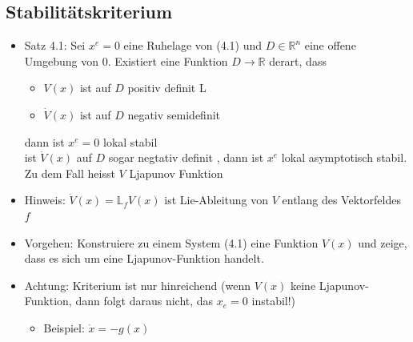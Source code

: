 \documentclass[ngerman]{tudscrreprt}
\begin{document}
\subsection{Stabilitätskriterium}
\begin{itemize}
\item Satz 4.1: Sei $x^e = 0$ eine Ruhelage von (4.1) und $D \in \mathbb{R}^n $ eine offene Umgebung von $0$. Existiert eine Funktion $D\rightarrow \mathbb{R}$ derart, dass

\begin{itemize}
\item $V(x)$ ist auf $D$ positiv definit L
\item $\dot V(x)$ ist auf $D$ negativ semidefinit
\end{itemize} 

dann ist $x^e = 0$ lokal stabil \\
ist $\dot V(x)$ auf $D$ sogar negtativ definit , dann ist $x^e$ lokal asymptotisch stabil. \\
Zu dem Fall heisst $V$ Ljapunov Funktion
\item Hinweis: $\dot V(x) = \mathbb{L}_fV(x) $ ist Lie-Ableitung von $V$ entlang des Vektorfeldes $f$
\item Vorgehen: Konstruiere zu einem System (4.1) eine Funktion $V(x)$ und zeige, dass es sich um eine Ljapunov-Funktion handelt.
\item Achtung: Kriterium ist nur hinreichend (wenn $V(x)$ keine Ljapunov-Funktion, dann folgt daraus nicht, das $x_e = 0$ instabil!)
\begin{itemize}
\item Beispiel: $\dot x = - g(x) $
\end{itemize}
\end{itemize}
\end{document}
